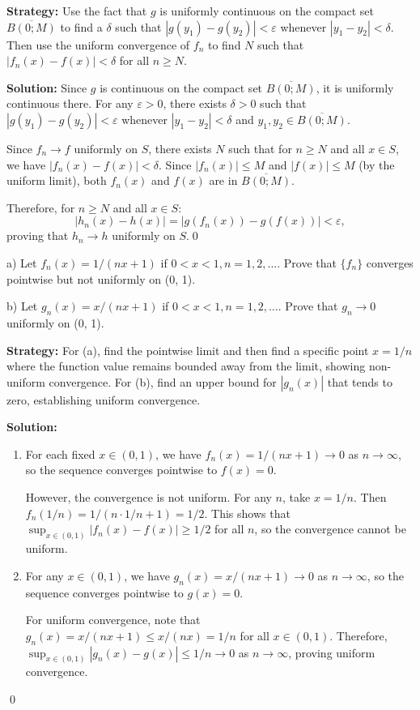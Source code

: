 \noindent\textbf{Strategy:} Use the fact that \( g \) is uniformly continuous on the compact set \( \overline{B(0; M)} \) to find a \( \delta \) such that \( |g(y_1) - g(y_2)| < \varepsilon \) whenever \( |y_1 - y_2| < \delta \). Then use the uniform convergence of \( f_n \) to find \( N \) such that \( |f_n(x) - f(x)| < \delta \) for all \( n \geq N \).

\bigskip\noindent\textbf{Solution:} Since \( g \) is continuous on the compact set \( \overline{B(0; M)} \), it is uniformly continuous there. For any \( \varepsilon > 0 \), there exists \( \delta > 0 \) such that \( |g(y_1) - g(y_2)| < \varepsilon \) whenever \( |y_1 - y_2| < \delta \) and \( y_1, y_2 \in \overline{B(0; M)} \).

Since \( f_n \to f \) uniformly on \( S \), there exists \( N \) such that for \( n \geq N \) and all \( x \in S \), we have \( |f_n(x) - f(x)| < \delta \). Since \( |f_n(x)| \leq M \) and \( |f(x)| \leq M \) (by the uniform limit), both \( f_n(x) \) and \( f(x) \) are in \( \overline{B(0; M)} \).

Therefore, for \( n \geq N \) and all \( x \in S \):
\[|h_n(x) - h(x)| = |g(f_n(x)) - g(f(x))| < \varepsilon,\]
proving that \( h_n \to h \) uniformly on \( S \).\qed


\begin{problembox}
a) Let \( f_n(x) = 1/(nx + 1) \) if \( 0 < x < 1, n = 1, 2, \ldots \). Prove that \( \{f_n\} \) converges pointwise but not uniformly on (0, 1).

b) Let \( g_n(x) = x/(nx + 1) \) if \( 0 < x < 1, n = 1, 2, \ldots \). Prove that \( g_n \to 0 \) uniformly on (0, 1).
\end{problembox}

\noindent\textbf{Strategy:} For (a), find the pointwise limit and then find a specific point \( x = 1/n \) where the function value remains bounded away from the limit, showing non-uniform convergence. For (b), find an upper bound for \( |g_n(x)| \) that tends to zero, establishing uniform convergence.

\bigskip\noindent\textbf{Solution:}
\begin{enumerate}[label=(\alph*)]
\item For each fixed \( x \in (0, 1) \), we have \( f_n(x) = 1/(nx + 1) \to 0 \) as \( n \to \infty \), so the sequence converges pointwise to \( f(x) = 0 \).

However, the convergence is not uniform. For any \( n \), take \( x = 1/n \). Then \( f_n(1/n) = 1/(n \cdot 1/n + 1) = 1/2 \). This shows that \( \sup_{x \in (0,1)} |f_n(x) - f(x)| \geq 1/2 \) for all \( n \), so the convergence cannot be uniform.

\item For any \( x \in (0, 1) \), we have \( g_n(x) = x/(nx + 1) \to 0 \) as \( n \to \infty \), so the sequence converges pointwise to \( g(x) = 0 \).

For uniform convergence, note that \( g_n(x) = x/(nx + 1) \leq x/(nx) = 1/n \) for all \( x \in (0, 1) \). Therefore, \( \sup_{x \in (0,1)} |g_n(x) - g(x)| \leq 1/n \to 0 \) as \( n \to \infty \), proving uniform convergence.
\end{enumerate}\qed


